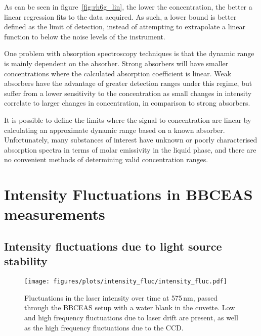 As can be seen in figure~\ref{fig:rh6g_lin}, the lower the concentration,
the better a linear regression fits to the data acquired. As such, a lower
bound is better defined as the limit of detection, instead of attempting to
extrapolate a linear function to below the noise levels of the instrument.

One problem with absorption spectroscopy techniques is that the dynamic range
is mainly dependent on the absorber. Strong absorbers will have smaller
concentrations where the calculated absorption coefficient is linear. Weak
absorbers have the advantage of greater detection ranges under this regime,
but suffer from a lower sensitivity to the concentration as small changes
in intensity correlate to larger changes in concentration, in comparison to
strong absorbers.

It is possible to define the limits where the signal to concentration
are linear by calculating an approximate dynamic range based on a known
absorber. Unfortunately, many substances of interest have unknown or poorly
characterised absorption spectra in terms of molar emissivity in the liquid
phase, and there are no convenient methods of determining valid concentration
ranges.



\section{Intensity Fluctuations in BBCEAS measurements}\label{sec:light_fluc}



\subsection{Intensity fluctuations due to light source stability}\label{subsec:laser_fluc}

\begin{figure}[t]
\begin{center}
  \texttt{[image: figures/plots/intensity\_fluc/intensity\_fluc.pdf]}
\end{center}
\caption[Intensity fluctuations through blank in \ac{BBCEAS} setup]{Fluctuations in the laser intensity over time at 575\,nm, passed through the \ac{BBCEAS} setup with a water blank in the cuvette. Low and high frequency fluctuations due to laser drift are present, as well as the high frequency fluctuations due to the \ac{CCD}.}
\label{fig:laser_fluc}
\end{figure}


